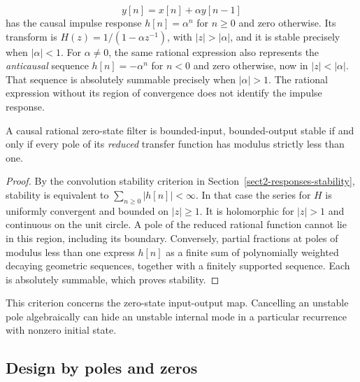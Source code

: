 
\begin{exmp}
\begin{equation}
\label{eq-recurrence-1st-order}
 y[n]=x[n]+\alpha y[n-1]
\end{equation}
has the causal impulse response $h[n]=\alpha^n$ for $n\geq0$ and zero
otherwise. Its transform is $H(z)=1/(1-\alpha z^{-1})$, with $|z|>|\alpha|$,
and it is stable precisely when $|\alpha|<1$. For $\alpha\ne0$, the same
rational expression also represents the \emph{anticausal} sequence
$h[n]=-\alpha^n$ for $n<0$ and zero otherwise, now in $|z|<|\alpha|$.
That sequence is absolutely summable precisely when $|\alpha|>1$.
The rational expression without its region of convergence does not
identify the impulse response.
\end{exmp}


\begin{prop}
\label{prop-poles-stability}
A causal rational zero-state filter is bounded-input, bounded-output
stable if and only if every pole of its \emph{reduced} transfer function
has modulus strictly less than one.
\end{prop}
\begin{proof}
By the convolution stability criterion in
Section~\ref{sect2-responses-stability}, stability is equivalent to
$\sum_{n\geq0}|h[n]|<\infty$. In that case the series for $H$ is uniformly
convergent and bounded on $|z|\geq1$. It is holomorphic for $|z|>1$ and
continuous on the unit circle. A pole of the reduced rational function
cannot lie in this region, including its boundary.
Conversely, partial fractions at poles of modulus less than one express
$h[n]$ as a finite sum of polynomially weighted decaying geometric
sequences, together with a finitely supported sequence. Each is absolutely
summable, which proves stability.
\end{proof}
This criterion concerns the zero-state input-output map. Cancelling an
unstable pole algebraically can hide an unstable internal mode in a
particular recurrence with nonzero initial state.

\subsection{Design by poles and zeros}

